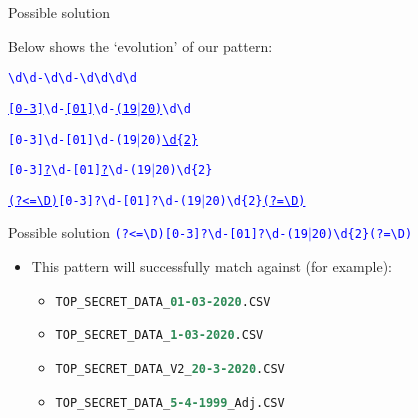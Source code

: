 \documentclass[
	usenames,
	dvipsnames,
	handout
] {beamer}
\newcommand{\reDigit}{\textbackslash{}d}
\newcommand{\reNonDigit}{\textbackslash{}D}
\newcommand{\rePattern}[1]{{\Large\texttt{\textcolor{blue}{#1}}}}
\begin{document}
\begin{frame}{Possible solution}

	Below shows the `evolution' of our pattern: \\
	\bigskip
	
	\rePattern{\reDigit\reDigit-\reDigit\reDigit-\reDigit\reDigit\reDigit\reDigit} \\
		\pause
	\bigskip
	
	\rePattern{\underline{[0-3]}\reDigit-\underline{[01]}\reDigit-\underline{(19$|$20)}\reDigit\reDigit} \\
	      	\pause
	\bigskip
	      		
	\rePattern{[0-3]\reDigit-[01]\reDigit-(19$|$20)\underline{\reDigit\{2\}}} \\
	      	\pause
	\bigskip
      
      \rePattern{[0-3]\underline{?}\reDigit-[01]\underline{?}\reDigit-(19$|$20)\reDigit\{2\}} \\
		\pause
	\bigskip
	
	\rePattern{\underline{(?\textless=\reNonDigit)}[0-3]?\reDigit-[01]?\reDigit-(19$|$20)\reDigit\{2\}\underline{(?=\reNonDigit)}} \\
\end{frame}
    
\begin{frame}{Possible solution}
	\rePattern{(?\textless=\reNonDigit)[0-3]?\reDigit-[01]?\reDigit-(19$|$20)\reDigit\{2\}(?=\reNonDigit)}
		\pause
		
	\medskip
	\begin{itemize}[label=\textbullet]
		\item This pattern will successfully match against (for example):
		      \pause
		      \begin{itemize}[label=\textendash]
		      	\item \texttt{TOP\_SECRET\_DATA\_\textbf{\textcolor{SeaGreen}{01-03-2020}}.CSV}
		      	      \pause
		      	\item \texttt{TOP\_SECRET\_DATA\_\textbf{\textcolor{SeaGreen}{1-03-2020}}.CSV}
		      	      \pause
		      	\item \texttt{TOP\_SECRET\_DATA\_V2\_\textbf{\textcolor{SeaGreen}{20-3-2020}}.CSV}
		      	      \pause
		      	\item \texttt{TOP\_SECRET\_DATA\_\textbf{\textcolor{SeaGreen}{5-4-1999}}\_Adj.CSV}
		      \end{itemize}
	\end{itemize}
\end{frame}
\end{document}
